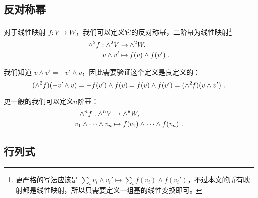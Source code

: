 

\subsection{反对称幂}

对于线性映射 $f: V \to W$，我们可以定义它的反对称幂，二阶幂为线性映射\footnote{更严格的写法应该是 $\sum_i v_i \wedge v_i' \mapsto \sum_i f(v_i) \wedge f(v_i')$，不过本文的所有映射都是线性映射，所以只需要定义一组基的线性变换即可。}
\begin{equation}
\begin{aligned}
{\large \wedge}^2 f: {\large \wedge}^2 V &\to {\large \wedge}^2 W, \\
v \wedge v' &\mapsto f(v) \wedge f(v')~.
\end{aligned}
\end{equation}

我们知道 $v \wedge v' = - v' \wedge v$，因此需要验证这个定义是良定义的：
\begin{equation}
({\large \wedge}^2 f)(- v' \wedge v) = - f(v') \wedge f(v) = f(v) \wedge f(v') = ({\large \wedge}^2 f)(v \wedge v')~.
\end{equation}

更一般的我们可以定义$n$阶幂：
\begin{equation}
\begin{aligned}
{\large \wedge}^n f: {\large \wedge}^n V &\to {\large \wedge}^n W, \\
v_1 \wedge \cdots \wedge v_n &\mapsto f(v_1) \wedge \cdots \wedge f(v_n)~.
\end{aligned}
\end{equation}

\subsection{行列式}

